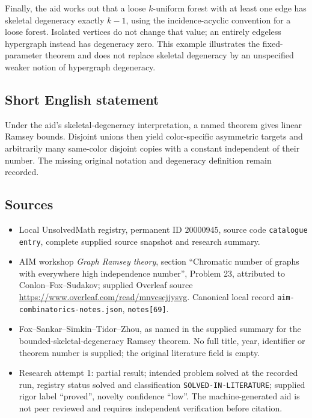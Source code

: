 \documentclass[11pt]{article}
\begin{document}
Finally, the aid works out that a loose $k$-uniform forest with at least one edge has skeletal degeneracy exactly $k-1$, using the incidence-acyclic convention for a loose forest. Isolated vertices do not change that value; an entirely edgeless hypergraph instead has degeneracy zero. This example illustrates the fixed-parameter theorem and does not replace skeletal degeneracy by an unspecified weaker notion of hypergraph degeneracy.
\subsection{Short English statement}
Under the aid's skeletal-degeneracy interpretation, a named theorem gives linear Ramsey bounds. Disjoint unions then yield color-specific asymmetric targets and arbitrarily many same-color disjoint copies with a constant independent of their number. The missing original notation and degeneracy definition remain recorded.
\subsection{Sources}
\begin{itemize}
\item Local UnsolvedMath registry, permanent ID $20000945$, source code \texttt{catalogue entry}, complete supplied source snapshot and research summary.
\item AIM workshop \emph{Graph Ramsey theory}, section ``Chromatic number of graphs with everywhere high independence number'', Problem 23, attributed to Conlon--Fox--Sudakov; supplied Overleaf source \url{https://www.overleaf.com/read/mnvcscjjysvg}. Canonical local record \texttt{aim-combinatorics-notes.json}, \texttt{notes[69]}.
\item Fox--Sankar--Simkin--Tidor--Zhou, as named in the supplied summary for the bounded-skeletal-degeneracy Ramsey theorem. No full title, year, identifier or theorem number is supplied; the original literature field is empty.
\item Research attempt 1: partial result; intended problem solved at the recorded run, registry status solved and classification \texttt{SOLVED-IN-LITERATURE}; supplied rigor label ``proved'', novelty confidence ``low''. The machine-generated aid is not peer reviewed and requires independent verification before citation.
\end{itemize}
\end{document}
